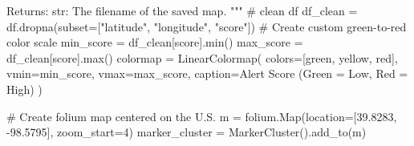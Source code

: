 \documentclass[
  letterpaper,
  DIV=11,
  numbers=noendperiod]{scrartcl}
\newenvironment{Shaded}{\begin{snugshade}}{\end{snugshade}}
\newcommand{\BuiltInTok}[1]{\textcolor[rgb]{0.00,0.23,0.31}{#1}}
\newcommand{\CommentTok}[1]{\textcolor[rgb]{0.37,0.37,0.37}{#1}}
\newcommand{\DecValTok}[1]{\textcolor[rgb]{0.68,0.00,0.00}{#1}}
\newcommand{\FloatTok}[1]{\textcolor[rgb]{0.68,0.00,0.00}{#1}}
\newcommand{\NormalTok}[1]{\textcolor[rgb]{0.00,0.23,0.31}{#1}}
\newcommand{\OperatorTok}[1]{\textcolor[rgb]{0.37,0.37,0.37}{#1}}
\newcommand{\StringTok}[1]{\textcolor[rgb]{0.13,0.47,0.30}{#1}}
\begin{document}
\begin{Shaded}
\begin{Highlighting}[]
\CommentTok{    Returns:}
\CommentTok{        str: The filename of the saved map.}
\CommentTok{    """}
    \CommentTok{\# clean df}
\NormalTok{    df\_clean }\OperatorTok{=}\NormalTok{ df.dropna(subset}\OperatorTok{=}\NormalTok{[}\StringTok{"latitude"}\NormalTok{, }\StringTok{"longitude"}\NormalTok{, }\StringTok{"score"}\NormalTok{])}
    \CommentTok{\# Create custom green{-}to{-}red color scale}
\NormalTok{    min\_score }\OperatorTok{=}\NormalTok{ df\_clean[}\StringTok{\textquotesingle{}score\textquotesingle{}}\NormalTok{].}\BuiltInTok{min}\NormalTok{()}
\NormalTok{    max\_score }\OperatorTok{=}\NormalTok{ df\_clean[}\StringTok{\textquotesingle{}score\textquotesingle{}}\NormalTok{].}\BuiltInTok{max}\NormalTok{()}
\NormalTok{    colormap }\OperatorTok{=}\NormalTok{ LinearColormap(}
\NormalTok{        colors}\OperatorTok{=}\NormalTok{[}\StringTok{\textquotesingle{}green\textquotesingle{}}\NormalTok{, }\StringTok{\textquotesingle{}yellow\textquotesingle{}}\NormalTok{, }\StringTok{\textquotesingle{}red\textquotesingle{}}\NormalTok{],}
\NormalTok{        vmin}\OperatorTok{=}\NormalTok{min\_score,}
\NormalTok{        vmax}\OperatorTok{=}\NormalTok{max\_score,}
\NormalTok{        caption}\OperatorTok{=}\StringTok{\textquotesingle{}Alert Score (Green = Low, Red = High)\textquotesingle{}}
\NormalTok{    )}

    \CommentTok{\# Create folium map centered on the U.S.}
\NormalTok{    m }\OperatorTok{=}\NormalTok{ folium.Map(location}\OperatorTok{=}\NormalTok{[}\FloatTok{39.8283}\NormalTok{, }\OperatorTok{{-}}\FloatTok{98.5795}\NormalTok{], zoom\_start}\OperatorTok{=}\DecValTok{4}\NormalTok{)}
\NormalTok{    marker\_cluster }\OperatorTok{=}\NormalTok{ MarkerCluster().add\_to(m)}


\end{Highlighting}
\end{Shaded}
\end{document}
